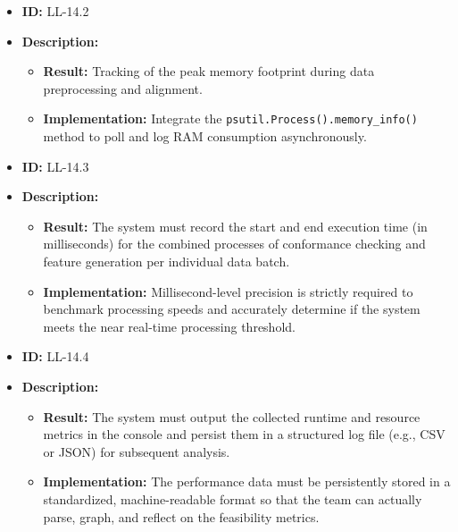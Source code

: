 \documentclass[12pt,a4paper]{article}
\begin{document}
\begin{itemize}
    \item \textbf{ID:} LL-14.2
    \item \textbf{Description:}
    \begin{itemize}
        \item \textbf{Result:} Tracking of the peak memory footprint during data preprocessing and alignment.
        \item \textbf{Implementation:} Integrate the \texttt{psutil.Process().memory\_info()} method to poll and log RAM consumption asynchronously.
    \end{itemize}
\end{itemize}
\vspace{1.5em}

\begin{itemize}
    \item \textbf{ID:} LL-14.3
    \item \textbf{Description:}
    \begin{itemize}
        \item \textbf{Result:} The system must record the start and end execution time (in milliseconds) for the combined processes of conformance checking and feature generation per individual data batch.
        \item \textbf{Implementation:} Millisecond-level precision is strictly required to benchmark processing speeds and accurately determine if the system meets the near real-time processing threshold.
    \end{itemize}
\end{itemize}
\vspace{1.5em}

\begin{itemize}
    \item \textbf{ID:} LL-14.4
    \item \textbf{Description:}
    \begin{itemize}
        \item \textbf{Result:} The system must output the collected runtime and resource metrics in the console and persist them in a structured log file (e.g., CSV or JSON) for subsequent analysis.
        \item \textbf{Implementation:} The performance data must be persistently stored in a standardized, machine-readable format so that the team can actually parse, graph, and reflect on the feasibility metrics.
    \end{itemize}
\end{itemize}
\vspace{1.5em}
\end{document}
